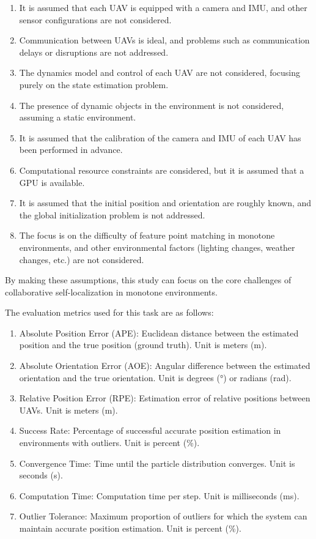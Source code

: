 \documentclass[a4paper,fleqn,10pt,twocolumn]{SICE_ISCS}
\begin{document}
\begin{enumerate}
\item It is assumed that each UAV is equipped with a camera and IMU, and other sensor configurations are not considered.
\item Communication between UAVs is ideal, and problems such as communication delays or disruptions are not addressed.
\item The dynamics model and control of each UAV are not considered, focusing purely on the state estimation problem.
\item The presence of dynamic objects in the environment is not considered, assuming a static environment.
\item It is assumed that the calibration of the camera and IMU of each UAV has been performed in advance.
\item Computational resource constraints are considered, but it is assumed that a GPU is available.
\item It is assumed that the initial position and orientation are roughly known, and the global initialization problem is not addressed.
\item The focus is on the difficulty of feature point matching in monotone environments, and other environmental factors (lighting changes, weather changes, etc.) are not considered.
\end{enumerate}

By making these assumptions, this study can focus on the core challenges of collaborative self-localization in monotone environments.

The evaluation metrics used for this task are as follows:

\begin{enumerate}
\item Absolute Position Error (APE): Euclidean distance between the estimated position and the true position (ground truth). Unit is meters (m).
\item Absolute Orientation Error (AOE): Angular difference between the estimated orientation and the true orientation. Unit is degrees (°) or radians (rad).
\item Relative Position Error (RPE): Estimation error of relative positions between UAVs. Unit is meters (m).
\item Success Rate: Percentage of successful accurate position estimation in environments with outliers. Unit is percent (\%).
\item Convergence Time: Time until the particle distribution converges. Unit is seconds (s).
\item Computation Time: Computation time per step. Unit is milliseconds (ms).
\item Outlier Tolerance: Maximum proportion of outliers for which the system can maintain accurate position estimation. Unit is percent (\%).
\end{enumerate}
\end{document}
